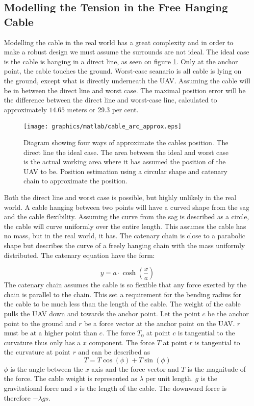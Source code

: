    

\subsection{Modelling the Tension in the Free Hanging Cable}
Modelling the cable in the real world has a great complexity and in order to make a robust design we must assume the surrounds are not ideal. The ideal case is the cable is hanging in a direct line, as seen on figure \ref{fig:cable_model_cases}. Only at the anchor point, the cable touches the ground. Worst-case seanario is all cable is lying on the ground, except what is directly underneath the UAV. Assuming the cable will be in between the direct line and worst case. The maximal position error will be the difference between the direct line and worst-case line, calculated to approximately $14.65$ meters or 29.3 per cent.

\begin{figure}[H]
\centering
\texttt{[image: graphics/matlab/cable\_arc\_approx.eps]}
\caption[Diagram showing 4 ways of approximate the cables position.]{Diagram showing four ways of approximate the cables position. The direct line the ideal case. The area between the ideal and worst case is the actual working area where it has assumed the position of the UAV to be. Position estimation using a circular shape and catenary chain to approximate the position.}
\label{fig:cable_model_cases}
\end{figure}

\noindent
Both the direct line and worst case is possible, but highly unlikely in the real world. A cable hanging between two points will have a curved shape from the sag and the cable flexibility. Assuming the curve from the sag is described as a circle, the cable will curve uniformly over the entire length. This assumes the cable has no mass, but in the real world, it has.
The catenary chain is close to a parabolic shape but describes the curve of a freely hanging chain with the mass uniformly distributed\cite{Whewelll1833}. The catenary equation have the form:

\begin{equation}
y = a \cdot \cosh\left(\frac{x}{a}\right)
\end{equation}
The catenary chain assumes the cable is so flexible that any force exerted by the chain is parallel to the chain. This set a requirement for the bending radius for the cable to be much less than the length of the cable.
The weight of the cable pulls the UAV down and towards the anchor point. Let the point $c$ be the anchor point to the ground and $r$ be a force vector at the anchor point on the UAV. $r$ must be at a higher point than $c$. The force $T_0$ at point $c$ is tangential to the curvature thus only has a $x$ component. The force $T$ at point $r$ is tangential to the curvature at point $r$ and can be described as
\begin{equation}
T = T \cos(\phi) +  T\sin(\phi)
\end{equation} 
$\phi$ is the angle between the $x$ axis and the force vector and $T$ is the magnitude of the force. The cable weight is represented as $\lambda$ per unit length. $g$ is the gravitational force and $s$ is the length of the cable. The downward force is therefore $-\lambda g s$.

